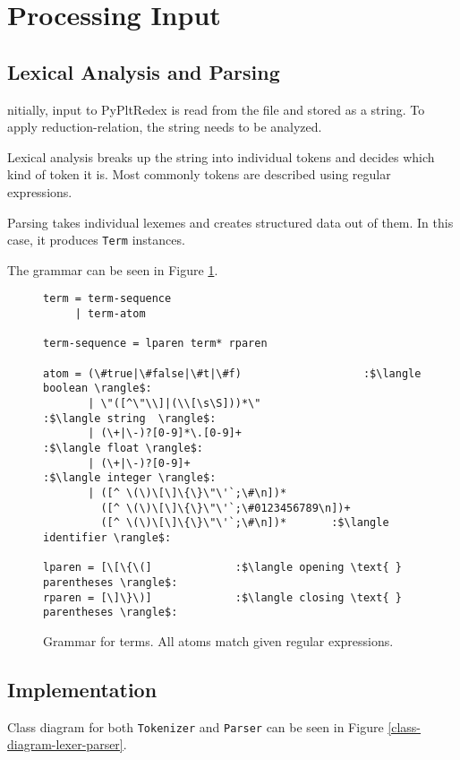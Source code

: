 \section{Processing Input}
\label{section:lex-parse}

\subsection{Lexical Analysis and Parsing}
nitially, input to PyPltRedex is read from the file and stored as a string. To apply reduction-relation, the string needs to be analyzed.

Lexical analysis breaks up the string into individual tokens and decides which kind of token it is. Most commonly tokens are described using regular expressions. 

Parsing takes individual lexemes and creates structured data out of them. In this case, it produces \texttt{Term} instances. 

The grammar can be seen in Figure \ref{tok-lex-grammar}.

\begin{figure}[h]
\begin{verbatim}
term = term-sequence 
     | term-atom

term-sequence = lparen term* rparen

atom = (\#true|\#false|\#t|\#f)					  :$\langle boolean \rangle$:
	   | \"([^\"\\]|(\\[\s\S]))*\"				   :$\langle string  \rangle$:
	   | (\+|\-)?[0-9]*\.[0-9]+					    :$\langle float \rangle$:
	   | (\+|\-)?[0-9]+							        :$\langle integer \rangle$:
	   | ([^ \(\)\[\]\{\}\"\'`;\#\n])*
	     ([^ \(\)\[\]\{\}\"\'`;\#0123456789\n])+ 
	     ([^ \(\)\[\]\{\}\"\'`;\#\n])*       :$\langle identifier \rangle$:

lparen = [\[\{\(]             :$\langle opening \text{ } parentheses \rangle$:
rparen = [\]\}\)]             :$\langle closing \text{ } parentheses \rangle$:
\end{verbatim} 
\caption{Grammar for terms. All atoms match given regular expressions.}
\label{tok-lex-grammar}
\end{figure}

\subsection{Implementation}
Class diagram for both \texttt{Tokenizer} and \texttt{Parser} can be seen in Figure \ref{class-diagram-lexer-parser}.

